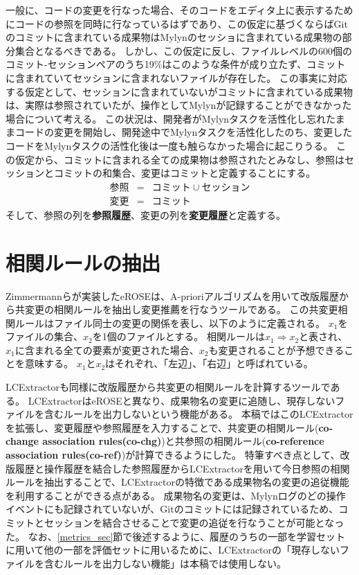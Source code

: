 \documentclass[a4paper]{jsbook}
\begin{document}
一般に、コードの変更を行なった場合、そのコードをエディタ上に表示するためにコードの参照を同時に行なっているはずであり、この仮定に基づくならばGitのコミットに含まれている成果物はMylynのセッショに含まれている成果物の部分集合となるべきである。
しかし、この仮定に反し、ファイルレベルの600個のコミット-セッションペアのうち19\%はこのような条件が成り立たず、コミットに含まれていてセッションに含まれないファイルが存在した。
この事実に対応する仮定として、セッションに含まれていないがコミットに含まれている成果物は、実際は参照されていたが、操作としてMylynが記録することができなかった場合について考える。
この状況は、開発者がMylynタスクを活性化し忘れたままコードの変更を開始し、開発途中でMylynタスクを活性化したのち、変更したコードをMylynタスクの活性化後は一度も触らなかった場合に起こりうる。
この仮定から、コミットに含まれる全ての成果物は参照されたとみなし、参照はセッションとコミットの和集合、変更はコミットと定義することにする。
\begin{eqnarray}
  参照 &=& コミット \cup セッション\\
  変更 &=&  コミット
\end{eqnarray}
そして、参照の列を{\bf 参照履歴}、変更の列を{\bf 変更履歴}と定義する。
\section{相関ルールの抽出}\label{extractrules_sec}
Zimmermannらが実装したeROSE\cite{Zimmermann:2005}は、A-prioriアルゴリズム\cite{Bondugula:2006}を用いて改版履歴から共変更の相関ルールを抽出し変更推薦を行なうツールである。
この共変更相関ルールはファイル同士の変更の関係を表し、以下のように定義される。
$x_1$をファイルの集合、$x_2$を1個のファイルとする。
相関ルールは$x_1 \Rightarrow x_2$と表され、$x_1$に含まれる全ての要素が変更された場合、$x_2$も変更されることが予想できることを意味する。
$x_1$と$x_2$はそれぞれ、「左辺」、「右辺」と呼ばれている。

LCExtractor\cite{Hagward:2015,Mori:2015}も同様に改版履歴から共変更の相関ルールを計算するツールである。
LCExtractorはeROSEと異なり、成果物名の変更に追随し、現存しないファイルを含むルールを出力しないという機能がある。
本稿ではこのLCExtractorを拡張し、変更履歴や参照履歴を入力することで、共変更の相関ルール({\bf co-change association rules(co-chg)})と共参照の相関ルール({\bf co-reference association rules(co-ref)})が計算できるようにした。
特筆すべき点として、改版履歴と操作履歴を結合した参照履歴からLCExtractorを用いて今日参照の相関ルールを抽出することで、LCExtractorの特徴である成果物名の変更の追従機能を利用することができる点がある。
成果物名の変更は、Mylynログのどの操作イベントにも記録されていないが、Gitのコミットには記録されているため、コミットとセッションを結合させることで変更の追従を行なうことが可能となった。
なお、\ref{metrics_sec}節で後述するように、履歴のうちの一部を学習セットに用いて他の一部を評価セットに用いるために、LCExtractorの「現存しないファイルを含むルールを出力しない機能」は本稿では使用しない。
\end{document}
